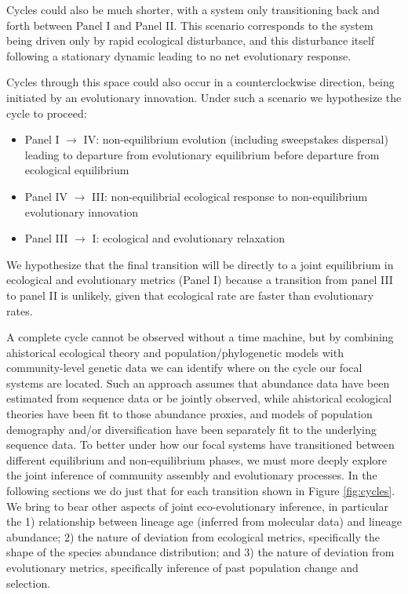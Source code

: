 \documentclass[12pt]{article}
\begin{document}
% 
% 
Cycles could also be much shorter, with a system only transitioning
back and forth between Panel I and Panel II. This scenario corresponds
to the system being driven only by rapid ecological disturbance, and
this disturbance itself following a stationary dynamic leading to no
net evolutionary response.

Cycles through this space could also occur in a counterclockwise
direction, being initiated by an evolutionary innovation. Under such a
scenario we hypothesize the cycle to proceed:

\begin{itemize}
\item Panel I $\rightarrow$ IV: non-equilibrium evolution (including
  sweepstakes dispersal) leading to departure from evolutionary
  equilibrium before departure from ecological equilibrium
\item Panel IV $\rightarrow$ III: non-equilibrial ecological response
  to non-equilibrium evolutionary innovation
\item Panel III $\rightarrow$ I: ecological and evolutionary
  relaxation
\end{itemize}

We hypothesize that the final transition will be directly to a joint
equilibrium in ecological and evolutionary metrics (Panel I) because a
transition from panel III to panel II is unlikely, given that
ecological rate are faster than evolutionary rates.

A complete cycle cannot be observed without a time machine, but by
combining ahistorical ecological theory and population/phylogenetic
models with community-level genetic data we can identify
where on the cycle our focal systems are located. Such an approach
assumes that abundance data have been estimated from sequence data or be jointly observed, while
ahistorical ecological theories have been fit to those abundance proxies,
and models of population demography and/or diversification have been
separately fit to the underlying sequence data. To better under how
our focal systems have transitioned between different equilibrium and
non-equilibrium phases, we must more deeply explore the joint
inference of community assembly and evolutionary processes. In the
following sections we do just that for each transition shown in Figure
\ref{fig:cycles}. We bring to bear other aspects of joint
eco-evolutionary inference, in particular the 1) relationship between
lineage age (inferred from molecular data) and lineage abundance; 2)
the nature of deviation from ecological metrics, specifically the
shape of the species abundance distribution; and 3) the nature of
deviation from evolutionary metrics, specifically inference of past
population change and selection.
\end{document}
